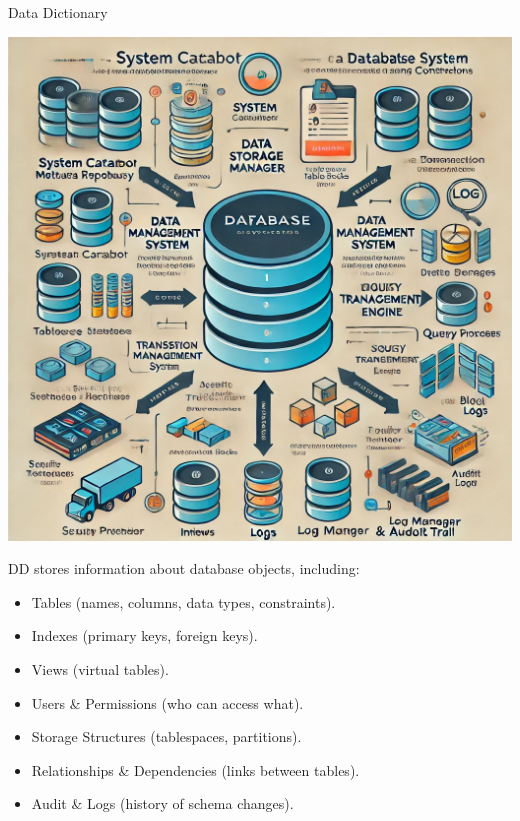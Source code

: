 \documentclass{beamer}
\begin{document}
\begin{frame}{Data Dictionary}
    \small
    \begin{minipage}{.40\textwidth}
        \includegraphics[width=\textwidth]{figures/dd}
    \end{minipage}\hfill
    \begin{minipage}{.55\textwidth}
        \tiny
        DD stores information about database objects, including:
        \begin{itemize}
            \item Tables (names, columns, data types, constraints).
            \item Indexes (primary keys, foreign keys).
            \item Views (virtual tables).
            \item Users \& Permissions (who can access what).
            \item Storage Structures (tablespaces, partitions).
            \item Relationships \& Dependencies (links between tables).
            \item Audit \& Logs (history of schema changes).
        \end{itemize}
    \end{minipage}
\end{frame}
\end{document}
